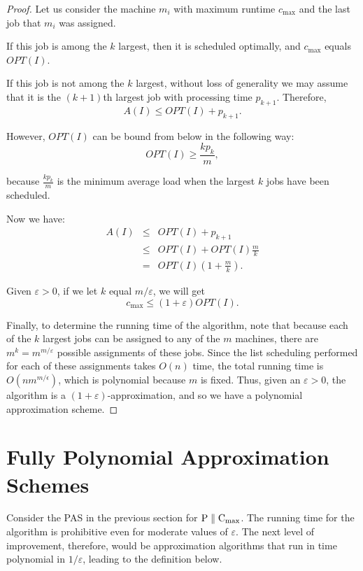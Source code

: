 \documentclass{article}
\begin{document}
\begin{proof}

Let us consider the machine $m_i$ with maximum runtime $c_{\max}$ and the last job that $m_i$ was
assigned.

If this job is among the $k$ largest, then it is scheduled optimally, and $c_{\max}$ equals
$OPT(I)$.

If this job is not among the $k$ largest, without loss of generality we may assume that it is the
$(k+1)$th largest job with processing time $p_{k+1}$. Therefore,
$$
A(I) \le OPT(I) + p_{k+1}.
$$

However, $OPT(I)$ can be bound from below in the following way:
$$
OPT(I) \ge \frac{k p_k}{m},
$$

because $\frac{k p_k}{m}$ is the minimum average load when the largest $k$ jobs have been
scheduled.

Now we have:
$$
\begin{array} {lcl}
A(I)    & \le & OPT(I) + p_{k+1} \\
        & \le & OPT(I) + OPT(I) \frac{m}{k} \\
        & = & OPT(I) \left( 1+\frac{m}{k} \right).
\end{array}
$$

Given $\varepsilon > 0$, if we let $k$ equal $m/\varepsilon$, we will get
$$
c_{\max} \le (1+\varepsilon) OPT(I).
$$

Finally, to determine the running time of the algorithm, note that because each of the $k$ largest
jobs can be assigned to any of the $m$ machines, there are $m^k = m^{m/\varepsilon}$ possible
assignments of these jobs. Since the list scheduling performed for each of these assignments takes
$O(n)$ time, the total running time is $O(nm^{m/\epsilon})$, which is polynomial because $m$ is
fixed. Thus, given an $\varepsilon >0$, the algorithm is a $(1+\varepsilon)$-approximation, and so
we have a polynomial approximation scheme.

\end{proof}

\section{Fully Polynomial Approximation Schemes}

Consider the PAS in the previous section for ${\rm P \parallel C_{\max}}$. The running time for
the algorithm is prohibitive even for moderate values of $\varepsilon$. The next level of
improvement, therefore, would be approximation algorithms that run in time polynomial in $1/
\varepsilon$, leading to the definition below.
\end{document}
